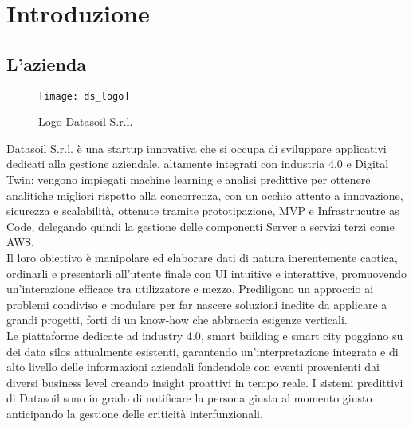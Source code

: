
\chapter{Introduzione}
\label{cap:introduzione}

\section{L'azienda}
\begin{figure}[ht]
    \centering
    \texttt{[image: ds\_logo]}
    \caption{Logo Datasoil S.r.l.}
\end{figure} 
\aCapo{}
Datasoil S.r.l. è una startup innovativa che si occupa di sviluppare applicativi dedicati alla gestione aziendale, altamente integrati con industria 4.0 e Digital Twin: vengono impiegati machine learning e analisi predittive per ottenere analitiche migliori rispetto alla concorrenza, con un occhio attento a innovazione, sicurezza e scalabilità, ottenute tramite prototipazione, MVP e Infrastrucutre as Code, delegando quindi la gestione delle componenti Server a servizi terzi come AWS.\\
Il loro obiettivo è manipolare ed elaborare dati di natura inerentemente caotica, ordinarli e presentarli all'utente finale con UI intuitive e interattive, promuovendo un'interazione efficace tra utilizzatore e mezzo. Prediligono un approccio ai problemi condiviso e modulare per far nascere soluzioni inedite da applicare a grandi progetti, forti di un know-how che abbraccia esigenze verticali.\\
Le piattaforme dedicate ad industry 4.0, smart building e smart city poggiano su dei data silos attualmente esistenti, garantendo un'interpretazione integrata e di alto livello delle informazioni aziendali fondendole con eventi provenienti dai diversi business level creando insight proattivi in tempo reale. I sistemi predittivi di Datasoil sono in grado di notificare la persona giusta al momento giusto anticipando la gestione delle criticità interfunzionali.







